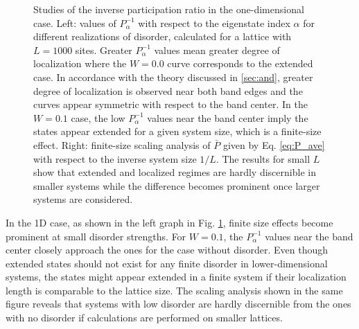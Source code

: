 \documentclass[10pt,a4paper]{article}
\begin{document}
\begin{figure}[H]
\caption{Studies of the inverse participation ratio in the one-dimensional case. Left: values of $P^{-1}_\alpha$ with respect to the eigenstate index $\alpha$ for different realizations of disorder, calculated for a lattice with $L=1000$ sites. Greater $P^{-1}_\alpha$ values mean greater degree of localization where the $W=0.0$ curve corresponds to the extended case. In accordance with the theory discussed in \autoref{sec:and}, greater degree of localization is observed near both band edges and the curves appear symmetric with respect to the band center. In the $W=0.1$ case, the low $P^{-1}_\alpha$ values near the band center imply the states appear extended for a given system size, which is a finite-size effect. Right: finite-size scaling analysis of $\bar{P}$ given by Eq. \eqref{eq:P_ave} with respect to the inverse system size $1/L$. The results for small $L$ show that extended and localized regimes are hardly discernible in smaller systems while the difference becomes prominent once larger systems are considered.   }
\label{fig:1D_ipr} 
\end{figure}
\noindent
In the 1D case, as shown in the left graph in Fig. \ref{fig:1D_ipr}, finite size effects become prominent at small disorder strengths. For $W=0.1$, the $P_\alpha^{-1}$ values near the band center closely approach the ones for the case without disorder. Even though extended states should not exist for any finite disorder in lower-dimensional systems, the states might appear extended in a finite system if their localization length is comparable to the lattice size. The scaling analysis shown in the same figure reveals that systems with low disorder are hardly discernible from the ones with no disorder if calculations are performed on smaller lattices.\\\\ 
\end{document}

